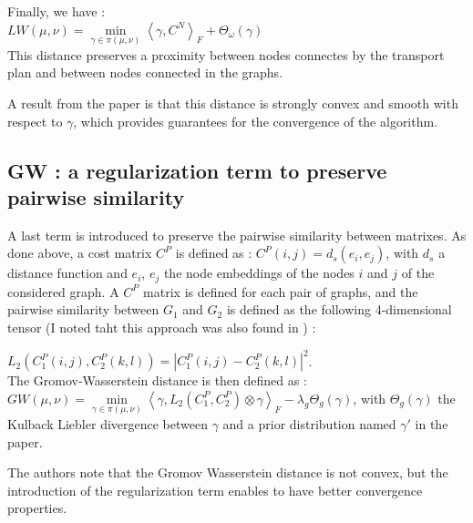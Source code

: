 \documentclass[a4paper,11pt]{article}
\begin{document}
Finally, we have : \\

$LW(\mu, \nu) = \underset{\gamma \in \pi(\mu, \nu)}{\operatorname{min}} {\left\langle \gamma , C^N \right\rangle}_F + \Theta_\omega(\gamma)$\\


This distance preserves a proximity between nodes connectes by the transport plan and between nodes connected in the graphs.


A result from the paper is that this distance is strongly convex and smooth with respect to $\gamma$, which provides guarantees for the convergence of the algorithm.\\


\subsection{GW : a regularization term to preserve pairwise similarity}
\label{GW}
A last term is introduced to preserve the pairwise similarity between matrixes. 
As done above, a cost matrix $C^P$ is defined as : $C^P(i,j) = d_s(e_i, e_j)$, with $d_s$ a distance function and $e_i$, $e_j$ the node embeddings of the nodes $i$ and $j$ of the considered graph. 
A $C^P$ matrix is defined for each pair of graphs, and the pairwise similarity between $G_1$ and $G_2$ is defined as the following 4-dimensional tensor (I noted taht this approach was also found in \cite{titouan2019optimal}) : 

$L_2(C_1^P(i,j), C_2^P(k,l)) = \left\lvert C_1^P(i,j) - C_2^P(k,l) \right\rvert ^2 $. \\

The Gromov-Wasserstein distance is then defined as : \\

$GW(\mu, \nu) = \underset{\gamma \in \pi(\mu, \nu)}{\operatorname{min}} {\left\langle \gamma , L_2(C_1^P, C_2^P) \otimes \gamma \right\rangle}_F - \lambda_g \Theta_g(\gamma)$, with $\Theta_g(\gamma) $ the Kulback Liebler divergence between $\gamma$ and a prior distribution named $\gamma '$ in the paper.

The authors note that the Gromov Wasserstein distance is not convex, but the introduction of the regularization term enables to have better convergence properties. \\[2cm]
\end{document}
